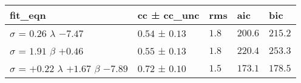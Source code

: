 \begin{tabular}{lllll}
\toprule
fit_eqn & cc ± cc_unc & rms & aic & bic \\
\midrule
$\sigma$ = $0.26$ $\lambda$ $-7.47$ & $0.54$ ± $0.13$ & $1.8$ & $200.6$ & $215.2$ \\
$\sigma$ = $1.91$ $\beta$ $+0.46$ & $0.55$ ± $0.13$ & $1.8$ & $220.4$ & $253.3$ \\
$\sigma$ = $+0.22$ $\lambda$ $+1.67$ $\beta$ $-7.89$ & $0.72$ ± $0.10$ & $1.5$ & $173.1$ & $178.5$ \\
\bottomrule
\end{tabular}
